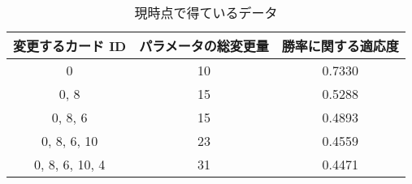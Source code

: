 \documentclass{jarticle}     %
\begin{document}
        \begin{table}[ht]
          \centering
          \caption{現時点で得ているデータ}
          \label{res_now}
          \begin{tabular}{|c|c|c|}
          \hline
          変更するカード ID     & パラメータの総変更量 & 勝率に関する適応度 \\ \hline
          0              & 10         & 0.7330   \\ \hline
          0, 8           & 15         & 0.5288   \\ \hline
          0, 8, 6        & 15         & 0.4893   \\ \hline
          0, 8, 6, 10    & 23         & 0.4559   \\ \hline
          0, 8, 6, 10, 4 & 31         & 0.4471    \\ \hline
          \end{tabular}
          \end{table}
  





\end{document}
